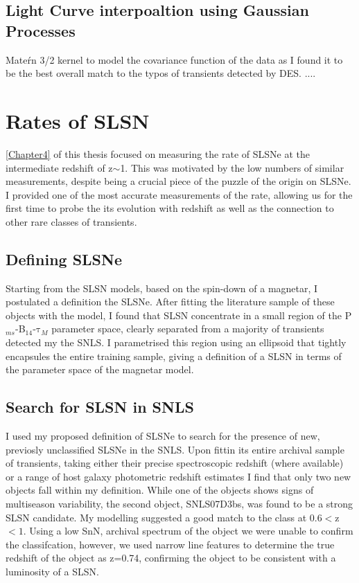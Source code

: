 \subsection{Light Curve interpoaltion using Gaussian Processes}
Mate\'rn 3/2 kernel to model the covariance function of the data as I found it to be the best overall match to the typos of transients detected by DES. ....

\section{Rates of SLSN}
\cref{Chapter4} of this thesis focused on measuring the rate of SLSNe at the intermediate redshift of z$\sim$1. This was motivated by the low numbers of similar measurements, despite being a crucial piece of the puzzle of the origin on SLSNe. I provided one of the most accurate measurements of the rate, allowing us for the first time to probe the its evolution with redshift as well as the connection to other rare classes of transients.

\subsection{Defining SLSNe}
Starting from the SLSN models, based on the spin-down of a magnetar, I postulated a definition the SLSNe. After fitting the literature sample of these objects with the model, I found that SLSN concentrate in a small region of the P$_{ms}$-B$_{14}$-$\mathrm{\tau}_M$ parameter space, clearly separated from a majority of transients detected my the SNLS. I parametrised this region using an ellipsoid that tightly encapsules the entire training sample, giving a definition of a SLSN in terms of the parameter space of the magnetar model.

\subsection{Search for SLSN in SNLS}
I used my proposed definition of SLSNe to search for the presence of new, previosly unclassified SLSNe in the SNLS. Upon fittin its entire archival sample of transients, taking either their precise spectroscopic redshift (where available) or a range of host galaxy photometric redshift estimates I find that only two new objects fall within my definition. While one of the objects shows signs of multiseason variability, the second object, SNLS07D3bs, was found to be a strong SLSN candidate. My modelling suggested a good match to the class at 0.6$<$z$<1$. Using a low Sn\/N, archival spectrum of the object we were unable to confirm the classifcation, however, we used narrow line features to determine the true redshift of the object as z=0.74, confirming the object to be consistent with a luminosity of a SLSN.

